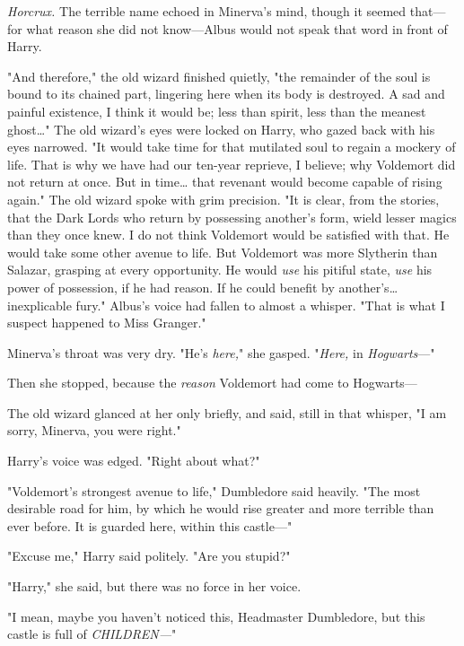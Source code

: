 \emph{Horcrux.} The terrible name echoed in Minerva's mind, though it seemed
that---for what reason she did not know---Albus would not speak that word in
front of Harry.

"And therefore," the old wizard finished quietly, "the remainder of the soul is
bound to its chained part, lingering here when its body is destroyed. A sad and
painful existence, I think it would be; less than spirit, less than the meanest
ghost{\ldots}" The old wizard's eyes were locked on Harry, who gazed back with
his eyes narrowed. "It would take time for that mutilated soul to regain a
mockery of life. That is why we have had our ten-year reprieve, I believe; why
Voldemort did not return at once. But in time{\ldots} that revenant would
become capable of rising again." The old wizard spoke with grim precision. "It
is clear, from the stories, that the Dark Lords who return by possessing
another's form, wield lesser magics than they once knew. I do not think
Voldemort would be satisfied with that. He would take some other avenue to
life. But Voldemort was more Slytherin than Salazar, grasping at every
opportunity. He would \emph{use} his pitiful state, \emph{use} his power of
possession, if he had reason. If he could benefit by another's{\ldots}
inexplicable fury." Albus's voice had fallen to almost a whisper. "That is what
I suspect happened to Miss Granger."

Minerva's throat was very dry. "He's \emph{here,}" she gasped. "\emph{Here,} in
\emph{Hogwarts}---"

Then she stopped, because the \emph{reason} Voldemort had come to Hogwarts---

The old wizard glanced at her only briefly, and said, still in that whisper, "I
am sorry, Minerva, you were right."

Harry's voice was edged. "Right about what?"

"Voldemort's strongest avenue to life," Dumbledore said heavily. "The most
desirable road for him, by which he would rise greater and more terrible than
ever before. It is guarded here, within this castle---"

"Excuse me," Harry said politely. "Are you stupid?"

"Harry," she said, but there was no force in her voice.

"I mean, maybe you haven't noticed this, Headmaster Dumbledore, but this castle
is full of \emph{CHILDREN---}"

